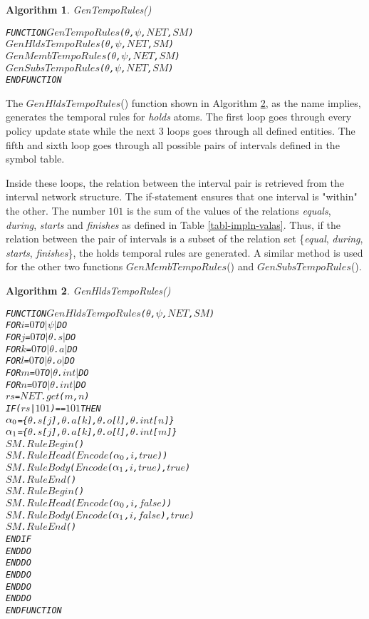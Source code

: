 \documentclass[11pt]{report}
\newenvironment{vverbatim}
{
  \begin{alltt}
}
{
    \vspace{-\baselineskip}
  \end{alltt}
}
\newtheorem{vvalgorithm}{Algorithm}[chapter]
\newenvironment{valgorithm}[2]
{
  \begin{vvalgorithm}{#1}
    \label{#2}
    \small
    \begin{vverbatim}
}
{
    \end{vverbatim}
  \end{vvalgorithm}
}
\begin{document}
          \begin{valgorithm}{GenTempoRules()}{algo-impln-gente}
FUNCTION \(GenTempoRules\)(\(\theta\), \(\psi\), \(NET\), \(SM\))
  \(GenHldsTempoRules\)(\(\theta\), \(\psi\), \(NET\), \(SM\))
  \(GenMembTempoRules\)(\(\theta\), \(\psi\), \(NET\), \(SM\))
  \(GenSubsTempoRules\)(\(\theta\), \(\psi\), \(NET\), \(SM\))
ENDFUNCTION
          \end{valgorithm}

          The $GenHldsTempoRules$() function shown in Algorithm
          \ref{algo-impln-ghdtr}, as the name implies, generates the temporal
          rules for {\em holds} atoms. The first loop goes through every policy
          update state while the next 3 loops goes through all defined
          entities. The fifth and sixth loop goes through all possible pairs
          of intervals defined in the symbol table.

          Inside these loops, the relation between the interval pair is
          retrieved from the interval network structure. The if-statement
          ensures that one interval is "within" the other. The number $101$ is
          the sum of the values of the relations {\em equals}, {\em during},
          {\em starts} and {\em finishes} as defined in Table
          \ref{tabl-impln-valas}. Thus, if the relation between the pair of
          intervals is a subset of the relation set \{{\em equal},
          {\em during}, {\em starts}, {\em finishes}\}, the holds temporal
          rules are generated. A similar method is used for the other two
          functions $GenMembTempoRules$() and $GenSubsTempoRules$().

          \begin{valgorithm}{GenHldsTempoRules()}{algo-impln-ghdtr}
FUNCTION \(GenHldsTempoRules\)(\(\theta\), \(\psi\), \(NET\), \(SM\))
  FOR \(i\) = \(0\) TO \(|\psi|\) DO
    FOR \(j\) = \(0\) TO \(|\)\(\theta\).\(s\)\(|\) DO
      FOR \(k\) = \(0\) TO \(|\)\(\theta\).\(a\)\(|\) DO
        FOR \(l\) = \(0\) TO \(|\)\(\theta\).\(o\)\(|\) DO
          FOR \(m\) = \(0\) TO \(|\)\(\theta\).\(int\)\(|\) DO
            FOR \(n\) = \(0\) TO \(|\)\(\theta\).\(int\)\(|\) DO
              \(rs\) = \(NET\).\(get\)(\(m\), \(n\))
              IF (\(rs\) | \(101\)) == \(101\) THEN
                \(\alpha\sb{0}\) = \{\(\theta\).\(s\)[\(j\)], \(\theta\).\(a\)[\(k\)], \(\theta\).\(o\)[\(l\)], \(\theta\).\(int\)[\(n\)]\}
                \(\alpha\sb{1}\) = \{\(\theta\).\(s\)[\(j\)], \(\theta\).\(a\)[\(k\)], \(\theta\).\(o\)[\(l\)], \(\theta\).\(int\)[\(m\)]\}
                \(SM\).\(RuleBegin\)()
                \(SM\).\(RuleHead\)(\(Encode\)(\(\alpha\sb{0}\), \(i\), \(true\)))
                \(SM\).\(RuleBody\)(\(Encode\)(\(\alpha\sb{1}\), \(i\), \(true\)), \(true\))
                \(SM\).\(RuleEnd\)()
                \(SM\).\(RuleBegin\)()
                \(SM\).\(RuleHead\)(\(Encode\)(\(\alpha\sb{0}\), \(i\), \(false\)))
                \(SM\).\(RuleBody\)(\(Encode\)(\(\alpha\sb{1}\), \(i\), \(false\)), \(true\))
                \(SM\).\(RuleEnd\)()
              ENDIF
          ENDDO
        ENDDO
      ENDDO
    ENDDO
  ENDDO
ENDFUNCTION
          \end{valgorithm}
\end{document}
